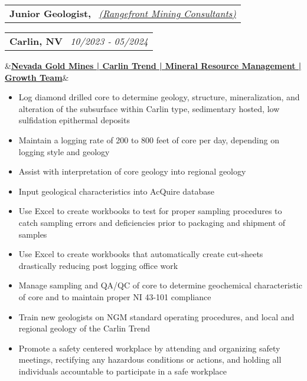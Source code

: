 \documentclass[12pt,a4paper,sans]{moderncv}
\makeatletter
\newcommand*{\customcventry}[7][.13em]{
\begin{tabular}{@{}l}
{\bfseries #4} \
{\itshape #3}
\end{tabular}
\hfill
\begin{tabular}{l@{}}
{\bfseries #5} \
{\itshape #2}
\end{tabular}
\ifx&#7&%
\else{\
\begin{minipage}{\maincolumnwidth}%
\small#7%
\end{minipage}}\fi%
\par\addvspace{#1}}
\makeatother
\begin{document}
\customcventry{10/2023 ‐ 05/2024}{{\color{blue}\href{https://www.rangefront.com/}{(Rangefront Mining Consultants)}}}{Junior Geologist,}{Carlin, NV}{}{\color{blue}\href{https://www.barrick.com/English/operations/nevada-gold-mines/default.aspx}{\textbf{Nevada Gold Mines | Carlin Trend | Mineral Resource Management | Growth Team}}}
\vspace{-1mm}
{\begin{itemize}[noitemsep, leftmargin=0.6cm, label={\textbullet}]
\item Log diamond drilled core to determine geology, structure, mineralization, and alteration of the subsurface within Carlin type, sedimentary hosted, low sulfidation epithermal deposits 
\item Maintain a logging rate of 200 to 800 feet of core per day, depending on logging style and geology
\item Assist with interpretation of core geology into regional geology 
\item Input geological characteristics into AcQuire database 
\item Use Excel to create workbooks to test for proper sampling procedures to catch sampling errors and deficiencies prior to packaging and shipment of samples
\item Use Excel to create workbooks that automatically create cut-sheets drastically reducing post logging office work 
\item Manage sampling and QA/QC of core to determine geochemical characteristic of core and to maintain proper NI 43-101 compliance
\item Train new geologists on NGM standard operating procedures, and local and regional geology of the Carlin Trend
\item Promote a safety centered workplace by attending and organizing safety meetings, rectifying any hazardous conditions or actions, and holding all individuals accountable to participate in a safe workplace
\end{itemize}}

\clearpage
\end{document}
